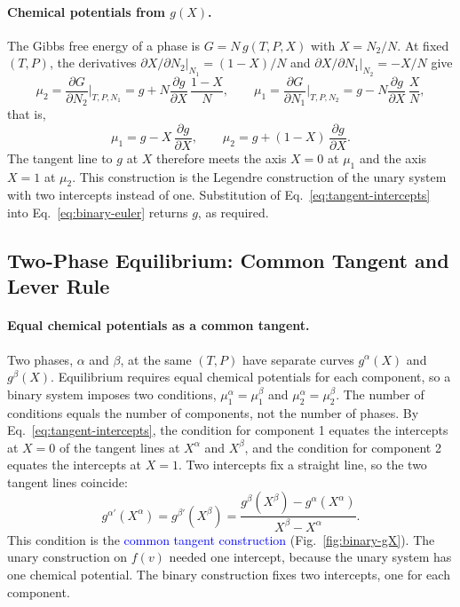 \paragraph{Chemical potentials from $g(X)$.}
The Gibbs free energy of a phase is $G=N\,g(T,P,X)$ with $X=N_2/N$. At fixed
$(T,P)$, the derivatives $\partial X/\partial N_2|_{N_1}=(1-X)/N$ and
$\partial X/\partial N_1|_{N_2}=-X/N$ give
\begin{equation*}
    \mu_2=\frac{\partial G}{\partial N_2}\bigg|_{T,P,N_1}
    =g+N\frac{\partial g}{\partial X}\,\frac{1-X}{N},
    \qquad
    \mu_1=\frac{\partial G}{\partial N_1}\bigg|_{T,P,N_2}
    =g-N\frac{\partial g}{\partial X}\,\frac{X}{N},
\end{equation*}
that is,
\begin{equation}
    \boxed{\mu_1=g-X\,\frac{\partial g}{\partial X},\qquad
    \mu_2=g+(1-X)\,\frac{\partial g}{\partial X}.}
    \label{eq:tangent-intercepts}
\end{equation}
The tangent line to $g$ at $X$ therefore meets the axis $X=0$ at $\mu_1$
and the axis $X=1$ at $\mu_2$. This construction is the Legendre
construction of the unary system with two intercepts instead of one.
Substitution of Eq.~\eqref{eq:tangent-intercepts} into
Eq.~\eqref{eq:binary-euler} returns $g$, as required.

\subsection{Two-Phase Equilibrium: Common Tangent and Lever Rule}

\paragraph{Equal chemical potentials as a common tangent.}
Two phases, $\alpha$ and $\beta$, at the same $(T,P)$ have separate curves
$g^\alpha(X)$ and $g^\beta(X)$. Equilibrium requires equal chemical
potentials for each component, so a binary system imposes two conditions,
$\mu_1^\alpha=\mu_1^\beta$ and $\mu_2^\alpha=\mu_2^\beta$. The number of
conditions equals the number of components, not the number of phases. By
Eq.~\eqref{eq:tangent-intercepts}, the condition for component 1 equates
the intercepts at $X=0$ of the tangent lines at $X^\alpha$ and $X^\beta$,
and the condition for component 2 equates the intercepts at $X=1$. Two
intercepts fix a straight line, so the two tangent lines coincide:
\begin{equation}
    \boxed{g^{\alpha\prime}(X^\alpha)=g^{\beta\prime}(X^\beta)
    =\frac{g^\beta(X^\beta)-g^\alpha(X^\alpha)}{X^\beta-X^\alpha}.}
\end{equation}
This condition is the \textcolor{blue}{common tangent construction}
(Fig.~\ref{fig:binary-gX}). The unary construction on $f(v)$ needed one
intercept, because the unary system has one chemical potential. The binary
construction fixes two intercepts, one for each component.


